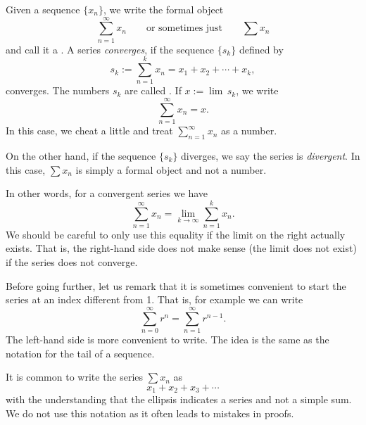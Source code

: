 \documentclass[12pt]{book}
\begin{document}
\begin{defn}
Given a sequence $\{ x_n \}$, we write the formal object
\begin{equation*}
\sum_{n=1}^\infty x_n
\qquad
\text{or sometimes just}
\qquad
\sum x_n
\end{equation*}
and call it a \emph{}.
A series
\emph{converges}, if the sequence $\{ s_k \}$
defined by
\begin{equation*}
s_k := \sum_{n=1}^k x_n = x_1 + x_2 + \cdots + x_k ,
\end{equation*}
converges.
The numbers $s_k$ are called
\emph{}.
If $x := \lim\, s_k$, we write
\begin{equation*}
\sum_{n=1}^\infty x_n =  x .
\end{equation*}
In this case, we cheat a little and treat
$\sum_{n=1}^\infty x_n$ as a number.

On the other hand, if the sequence $\{ s_k \}$ diverges,
we say the series is \emph{divergent}.
In this case, $\sum x_n$ is simply a formal object and not a number.
\end{defn}

In other words, for a convergent series we have
\begin{equation*}
\sum_{n=1}^\infty x_n
=
\lim_{k\to\infty} 
\sum_{n=1}^k x_n .
\end{equation*}
We should be careful to only use this equality if the limit on
the right actually exists.
That is, the right-hand side does not make
sense (the limit does not exist) if the series does not converge.

\begin{remark}
Before going further, let us remark that it is sometimes convenient to start
the series at an index different from 1.
That is, for example we can write
\begin{equation*}
\sum_{n=0}^\infty r^n = \sum_{n=1}^\infty r^{n-1} .
\end{equation*}
The left-hand side is more convenient to write.
The idea is the same as
the notation for the tail of a sequence.
\end{remark}

\begin{remark}
It is common to write the series $\sum x_n$ as
\begin{equation*}
x_1 + x_2 + x_3 + \cdots
\end{equation*}
with the understanding that the ellipsis indicates a series and
not a simple sum.
We do not use this notation as it often leads to 
mistakes in proofs.
\end{remark}
\end{document}

